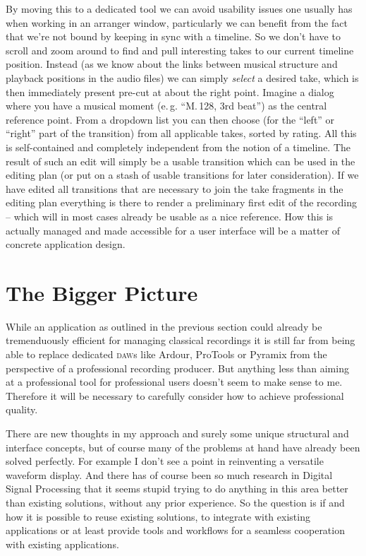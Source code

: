 \documentclass[11pt,a4paper]{article}
\begin{document}
By moving this to a dedicated tool we can avoid usability issues one usually has when working in an arranger window, particularly we can benefit from the fact that we're not bound by keeping in sync with a timeline.
So we don't have to scroll and zoom around to find and pull interesting takes to our current timeline position.
Instead (as we know about the links between musical structure and playback positions in the audio files) we can simply \emph{select} a desired take, which is then immediately present pre-cut at about the right point.
Imagine a dialog where you have a musical moment (e.\,g. “M.\,128, 3rd beat”) as the central reference point.
From a dropdown list you can then choose (for the “left” or “right” part of the transition) from all applicable takes, sorted by rating.
All this is self-contained and completely independent from the notion of a timeline.
The result of such an edit will simply be a usable transition which can be used in the editing plan (or put on a stash of usable transitions for later consideration).
If we have edited all transitions that are necessary to join the take fragments in the editing plan everything is there to render a preliminary first edit of the recording -- which will in most cases already be usable as a nice reference.
How this is actually managed and made accessible for a user interface will be a matter of concrete application design.

\section{The Bigger Picture}
While an application as outlined in the previous section could already be tremenduously efficient for managing classical recordings it is still far from being able to replace dedicated \textsc{daw}s like Ardour, ProTools or Pyramix from the perspective of a professional recording producer.
But anything less than aiming at a professional tool for professional users doesn't seem to make sense to me.
Therefore it will be necessary to carefully consider how to achieve professional quality.

There are new thoughts in my approach and surely some unique structural and interface concepts, but of course many of the problems at hand have already been solved perfectly.
For example I don't see a point in reinventing a versatile waveform display.
And there has of course been so much research in Digital Signal Processing that it seems stupid trying to do anything in this area better than existing solutions, without any prior experience.
So the question is if and how it is possible to reuse existing solutions, to integrate with existing applications or at least provide tools and workflows for a seamless cooperation with existing applications.
\end{document}
